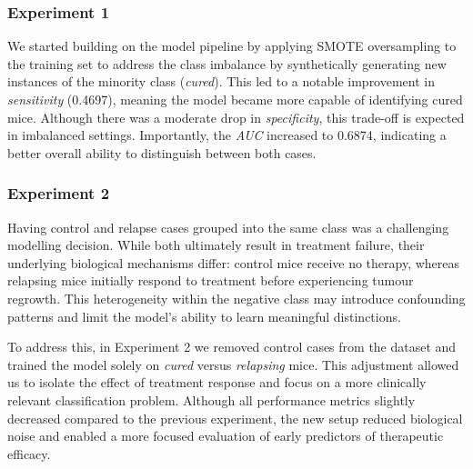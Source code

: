 \documentclass[12pt, a4paper]{report}
\begin{document}
\subsubsection{Experiment 1}
We started building on the model pipeline by applying SMOTE oversampling to the training set to address the class imbalance by synthetically generating new instances of the minority class (\textit{cured}). This led to a notable improvement in \textit{sensitivity} (0.4697), meaning the model became more capable of identifying cured mice. Although there was a moderate drop in \textit{specificity}, this trade-off is expected in imbalanced settings. Importantly, the \textit{AUC} increased to 0.6874, indicating a better overall ability to distinguish between both cases. 

\begin{table}[H]
\centering
\renewcommand{\arraystretch}{1.5} %
\normalsize %
\caption{Configuration 1 - Oversample}
\end{table}


\subsubsection{Experiment 2}

Having control and relapse cases grouped into the same class was a challenging modelling decision. While both ultimately result in treatment failure, their underlying biological mechanisms differ: control mice receive no therapy, whereas relapsing mice initially respond to treatment before experiencing tumour regrowth. This heterogeneity within the negative class may introduce confounding patterns and limit the model’s ability to learn meaningful distinctions.

To address this, in Experiment 2 we removed control cases from the dataset and trained the model solely on \textit{cured} versus \textit{relapsing} mice. This adjustment allowed us to isolate the effect of treatment response and focus on a more clinically relevant classification problem. Although all performance metrics slightly decreased compared to the previous experiment, the new setup reduced biological noise and enabled a more focused evaluation of early predictors of therapeutic efficacy.
\end{document}

